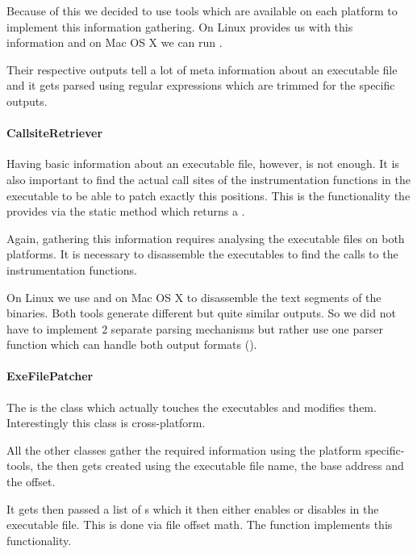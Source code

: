 Because of this we decided to use tools which are available on each platform to implement this information gathering.  On Linux  provides us with this information and on Mac OS X we can run .

Their respective outputs tell a lot of meta information about an executable file and it gets parsed using regular expressions which are trimmed for the specific outputs.

\paragraph{CallsiteRetriever}

Having basic information about an executable file, however, is not enough.  It is also important to find the actual call sites of the instrumentation functions in the executable to be able to patch exactly this positions.  This is the functionality the  provides via the static method  which returns a .

Again, gathering this information requires analysing the executable files on both platforms.  It is necessary to disassemble the executables to find the calls to the instrumentation functions.

On Linux we use  and on Mac OS X  to disassemble the text segments of the binaries.  Both tools generate different but quite similar outputs.  So we did not have to implement 2 separate parsing mechanisms but rather use one parser function which can handle both output formats ().

\paragraph{ExeFilePatcher}

The  is the class which actually touches the executables and modifies them.  Interestingly this class is cross-platform.

All the other classes gather the required information using the platform specific-tools, the  then gets created using the executable file name, the base address and the offset.

It gets then passed a list of s which it then either enables or disables in the executable file.  This is done via file offset math.
The function  implements this functionality.

